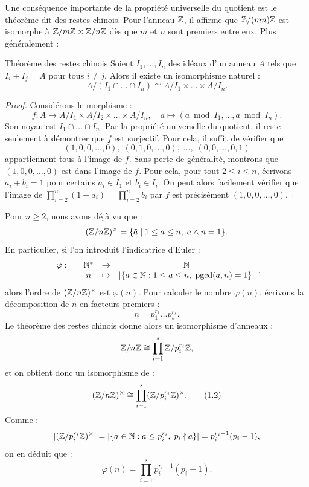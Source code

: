 \documentclass[]{report}
\begin{document}
Une conséquence importante de la propriété universelle du quotient est le théorème dit des restes chinois. Pour l'anneau $\mathbb{Z}$, il affirme que $\mathbb{Z}/(mn)\mathbb{Z}$ est isomorphe à $\mathbb{Z}/m\mathbb{Z} \times \mathbb{Z}/n\mathbb{Z}$ dès que $m$ et $n$ sont premiers entre eux. Plus généralement :

\begin{tm}{Théorème des restes chinois}{}
    Soient $I_1, \ldots, I_n$ des idéaux d'un anneau $A$ tels que $I_i + I_j = A$ pour tous $i \neq j$. Alors il existe un isomorphisme naturel :
    \[A/(I_1 \cap \dots \cap I_n) \cong A/I_1 \times \dots \times A/I_n.\]
\end{tm}

\begin{proof}
    Considérons le morphisme :
    \[f : A \to A/I_1 \times A/I_2 \times \dots \times A/I_n, \quad a \mapsto (a \bmod I_1, \dots, a \bmod I_n).\]
    Son noyau est $I_1 \cap \ldots \cap I_n$. Par la propriété universelle du quotient, il reste seulement à démontrer que $f$ est surjectif. Pour cela, il suffit de vérifier que
    \[(1, 0, 0, \dots, 0), \; (0, 1, 0, \dots, 0), \; \dots, \; (0, 0, \dots, 0, 1)\]
    appartiennent tous à l'image de $f$. Sans perte de généralité, montrons que $(1, 0, 0, \ldots, 0)$ est dans l'image de $f$. Pour cela, pour tout $2 \le i \le n$, écrivons $a_i + b_i = 1$ pour certains $a_i \in I_1$ et $b_i \in I_i$. On peut alors facilement vérifier que l'image de $\prod_{i=2}^{n}(1 - a_i) = \prod_{i=2}^{n} b_i$ par $f$ est précisément $(1, 0, 0, \ldots, 0)$.
\end{proof}

\begin{ex}{}{}
    Pour $n \ge 2$, nous avons déjà vu que :
    \[(\mathbb{Z}/n\mathbb{Z})^{\times} = \{\tilde{a} \mid 1 \le a \le n, \; a \wedge n = 1\}.\]
    En particulier, si l'on introduit l'indicatrice d'Euler :
    \[\begin{array}{ccccc} \varphi : & & \mathbb{N}^* & \to & \mathbb{N} \\ & & n & \mapsto & |\{a \in \mathbb{N} : 1 \le a \le n, \; \text{pgcd}(a, n) = 1\}| \end{array},\]
    alors l'ordre de $(\mathbb{Z}/n\mathbb{Z})^{\times}$ est $\varphi(n)$. Pour calculer le nombre $\varphi(n)$, écrivons la décomposition de $n$ en facteurs premiers :
    \[n = p_1^{r_1} \dots p_s^{r_s}.\]
    Le théorème des restes chinois donne alors un isomorphisme d'anneaux :
    \[\mathbb{Z}/n\mathbb{Z} \cong \prod_{i = 1}^{s} \mathbb{Z}/p_i^{r_i}\mathbb{Z},\]
    et on obtient donc un isomorphisme de \grs :
    \[(\mathbb{Z}/n\mathbb{Z})^{\times} \cong \prod_{i = 1}^{s} (\mathbb{Z}/p_i^{r_i}\mathbb{Z})^{\times}. \tag{1.2}\]
    Comme :
    \[|(\mathbb{Z}/p_i^{r_i}\mathbb{Z})^{\times}| = |\{a \in \mathbb{N} : a \le p_i^{r_i}, \; p_i \nmid a\}| = p_i^{r_i - 1}(p_i - 1),\]
    on en déduit que :
    \[\varphi(n) = \prod_{i = 1}^{s} p_i^{r_i - 1}(p_i - 1).\]
\end{ex}
\end{document}
